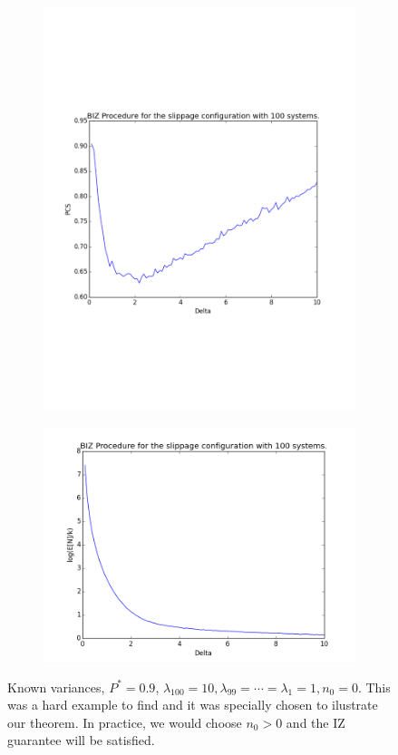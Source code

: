 \documentclass{wscpaperproc}
\theoremstyle{wsc}
\begin{document}
\begin{figure}
    \centering
    \begin{subfigure}[b]{0.4\textwidth}
        \centering
        \includegraphics[width=\textwidth]{plot1}
    \end{subfigure}
    \hfill
    \begin{subfigure}[b]{0.4\textwidth}
        \centering
        \includegraphics[width=\textwidth]{plot2}
    \end{subfigure}
    \caption{Known variances, $P^*=0.9$, $\lambda_{100}=10,\lambda_{99}=\cdots=\lambda_{1}=1,n_{0}=0$. This was a hard example to find
    and it was specially chosen to ilustrate our theorem. In practice, we would choose $n_{0}>0$ and the IZ guarantee will be satisfied. \label{fig: tahi}}
\end{figure}
\end{document}
